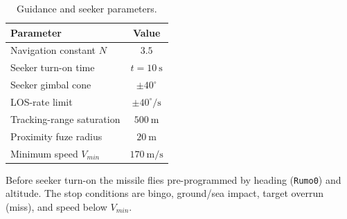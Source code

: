 \begin{table}[H]
\centering
\caption{Guidance and seeker parameters.}
\begin{tabular}{lc}
\toprule
Parameter & Value \\
\midrule
Navigation constant $N$ & $3.5$ \\
Seeker turn-on time & $t=10~\text{s}$ \\
Seeker gimbal cone & $\pm 40^\circ$ \\
LOS-rate limit & $\pm 40^\circ/\text{s}$ \\
Tracking-range saturation & $500~\text{m}$ \\
Proximity fuze radius & $20~\text{m}$ \\
Minimum speed $V_{min}$ & $170~\text{m/s}$ \\
\bottomrule
\end{tabular}
\end{table}

Before seeker turn-on the missile flies pre-programmed by heading (\texttt{Rumo0}) and altitude. The stop conditions are bingo, ground/sea impact, target overrun (miss), and speed below $V_{min}$.
